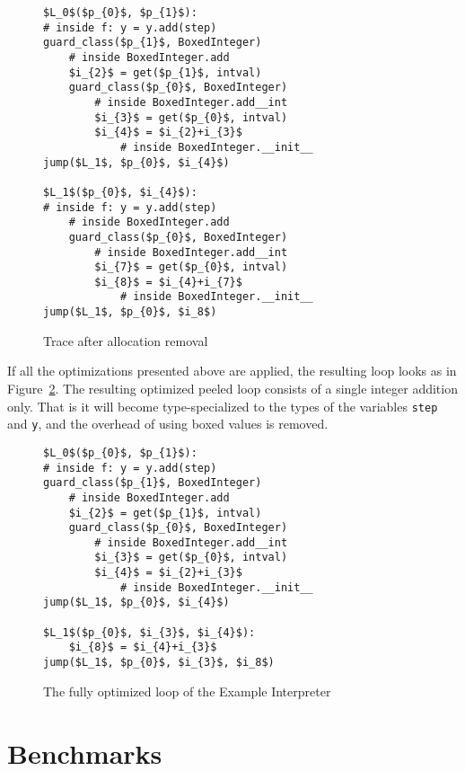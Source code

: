 \documentclass[preprint]{sigplanconf}
\begin{document}
\begin{figure}
\begin{lstlisting}[mathescape,numbers = right,basicstyle=\setstretch{1.05}\ttfamily\scriptsize]
$L_0$($p_{0}$, $p_{1}$):
# inside f: y = y.add(step)
guard_class($p_{1}$, BoxedInteger)
    # inside BoxedInteger.add
    $i_{2}$ = get($p_{1}$, intval)
    guard_class($p_{0}$, BoxedInteger)
        # inside BoxedInteger.add__int
        $i_{3}$ = get($p_{0}$, intval)
        $i_{4}$ = $i_{2}+i_{3}$
            # inside BoxedInteger.__init__
jump($L_1$, $p_{0}$, $i_{4}$)

$L_1$($p_{0}$, $i_{4}$):
# inside f: y = y.add(step)
    # inside BoxedInteger.add
    guard_class($p_{0}$, BoxedInteger)
        # inside BoxedInteger.add__int
        $i_{7}$ = get($p_{0}$, intval)
        $i_{8}$ = $i_{4}+i_{7}$
            # inside BoxedInteger.__init__
jump($L_1$, $p_{0}$, $i_8$)
\end{lstlisting}
\caption{Trace after allocation removal}
\label{fig:virtual-trace}
\end{figure}

If all the optimizations presented above are applied, the resulting loop looks
as in Figure~\ref{fig:opt-trace}.
The resulting optimized peeled loop consists of a single integer addition
only. That is it will become type-specialized to the types of the
variables \lstinline{step} and \lstinline{y}, and the overhead of
using boxed values is removed.


\begin{figure}
\begin{lstlisting}[mathescape,numbers = right,basicstyle=\setstretch{1.05}\ttfamily\scriptsize]
$L_0$($p_{0}$, $p_{1}$):
# inside f: y = y.add(step)
guard_class($p_{1}$, BoxedInteger)
    # inside BoxedInteger.add
    $i_{2}$ = get($p_{1}$, intval)
    guard_class($p_{0}$, BoxedInteger)
        # inside BoxedInteger.add__int
        $i_{3}$ = get($p_{0}$, intval)
        $i_{4}$ = $i_{2}+i_{3}$
            # inside BoxedInteger.__init__
jump($L_1$, $p_{0}$, $i_{4}$)

$L_1$($p_{0}$, $i_{3}$, $i_{4}$):
    $i_{8}$ = $i_{4}+i_{3}$
jump($L_1$, $p_{0}$, $i_{3}$, $i_8$)
\end{lstlisting}
\caption{The fully optimized loop of the Example Interpreter}
\label{fig:opt-trace}
\end{figure}


\section{Benchmarks}
\end{document}
